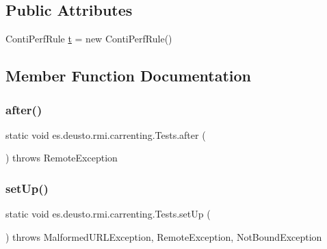 \subsection*{Public Attributes}
\begin{DoxyCompactItemize}
\item 
Conti\+Perf\+Rule \mbox{\hyperlink{classes_1_1deusto_1_1rmi_1_1carrenting_1_1_tests_adf1163c82f75d1405b6b3b87926e465c}{t}} = new Conti\+Perf\+Rule()
\end{DoxyCompactItemize}


\subsection{Member Function Documentation}
\mbox{\label{classes_1_1deusto_1_1rmi_1_1carrenting_1_1_tests_ae178c6eeb0adf18db0b0463190ecb073}} 
\subsubsection{\texorpdfstring{after()}{after()}}
{\footnotesize\ttfamily static void es.\+deusto.\+rmi.\+carrenting.\+Tests.\+after (\begin{DoxyParamCaption}{ }\end{DoxyParamCaption}) throws Remote\+Exception\hspace{0.3cm}{\ttfamily [static]}}

\mbox{\label{classes_1_1deusto_1_1rmi_1_1carrenting_1_1_tests_a1a620da71412f1f21332621c6bfd3452}} 
\subsubsection{\texorpdfstring{setUp()}{setUp()}}
{\footnotesize\ttfamily static void es.\+deusto.\+rmi.\+carrenting.\+Tests.\+set\+Up (\begin{DoxyParamCaption}{ }\end{DoxyParamCaption}) throws Malformed\+U\+R\+L\+Exception, Remote\+Exception, Not\+Bound\+Exception\hspace{0.3cm}{\ttfamily [static]}}

